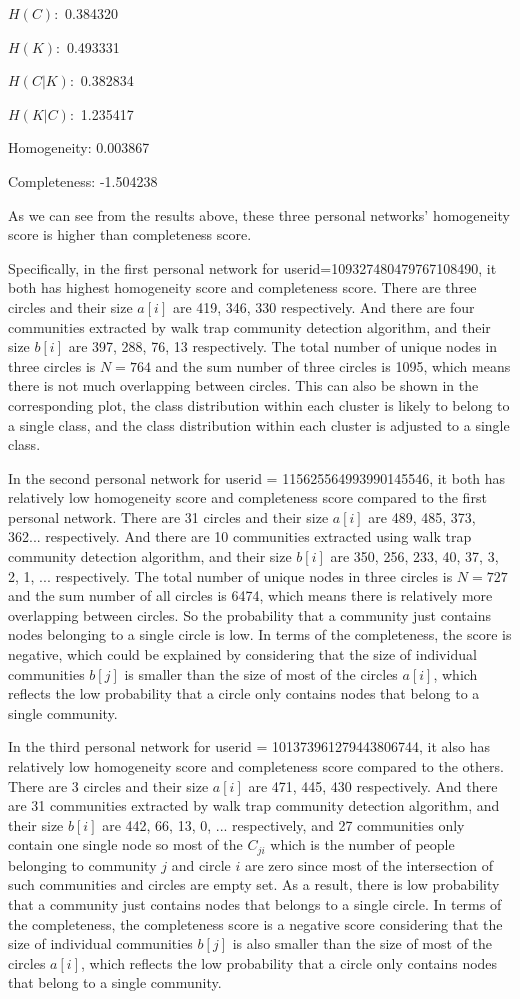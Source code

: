 \documentclass[11pt]{article}
\begin{document}
$H(C):$ 0.384320

$H(K):$ 0.493331

$H(C | K):$ 0.382834

$H(K | C):$ 1.235417 

Homogeneity: 0.003867 

Completeness: -1.504238

As we can see from the results above, these three personal networks’ homogeneity score is higher than completeness score.

Specifically, in the first personal network for userid=109327480479767108490, it both has highest homogeneity score and completeness score. There are three circles and their size $a[i]$ are 419, 346, 330 respectively. And there are four communities extracted by walk trap community detection algorithm, and their size $b[i]$ are 397, 288, 76, 13 respectively. The total number of unique nodes in three circles is $N = 764$ and the sum number of three circles is 1095, which means there is not much overlapping between circles. This can also be shown in the corresponding plot, the class distribution within each cluster is likely to belong to a single class, and the class distribution within each cluster is adjusted to a single class.

In the second personal network for userid = 115625564993990145546, it both has relatively low homogeneity score and completeness score compared to the first personal network. There are 31 circles and their size $a[i]$ are 489, 485, 373, 362... respectively. And there are 10 communities extracted using walk trap community detection algorithm, and their size $b[i]$ are 350, 256, 233, 40, 37, 3, 2, 1, ... respectively. The total number of unique nodes in three circles is $N = 727$ and the sum number of all circles is 6474, which means there is relatively more overlapping between circles. So the probability that a community just contains nodes belonging to a single circle is low. In terms of the completeness, the score is negative, which could be explained by considering that the size of individual communities $b[j]$ is smaller than the size of most of the circles $a[i]$, which reflects the low probability that a circle only contains nodes that belong to a single community.

In the third personal network for userid = 101373961279443806744, it also has relatively low homogeneity score and completeness score compared to the others. There are 3 circles and their size $a[i]$ are 471, 445, 430 respectively. And there are 31 communities extracted by walk trap community detection algorithm, and their size $b[i]$ are 442, 66, 13, 0, ... respectively, and 27 communities only contain one single node so most of the $C_{ji}$ which is the number of people belonging to community $j$ and circle $i$ are zero since most of the intersection of such communities and circles are empty set. As a result, there is low probability that a community just contains nodes that belongs to a single circle. In terms of the completeness, the completeness score is a negative score considering that the size of individual communities $b[j]$ is also smaller than the size of most of the circles $a[i]$, which reflects the low probability that a circle only contains nodes that belong to a single community.
\end{document}
